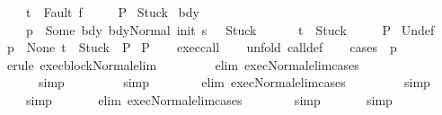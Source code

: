 \begin{isabellebody}
\ \ \ \ \ t\ {\isacharequal}\ Fault\ f{\isasymrbrakk}\isanewline
\ \ \ \ {\isasymLongrightarrow}\ P{\isachardoublequoteclose}\isanewline
{}\ Stuck{\isacharcolon}\isanewline
\ {\isachardoublequoteopen}{\isasymAnd}bdy{\isachardot}\isanewline
\ \ \ \ {\isasymlbrakk}{\isasymGamma}\ p\ {\isacharequal}\ Some\ bdy{\isacharsemicolon}\ {\isasymGamma}{\isasymturnstile}{\isasymlangle}bdy{\isacharcomma}Normal\ {\isacharparenleft}init\ s{\isacharparenright}{\isasymrangle}\ {\isasymRightarrow}\ \ Stuck{\isacharsemicolon}\ \isanewline
\ \ \ \ \ t\ {\isacharequal}\ Stuck{\isasymrbrakk}\isanewline
\ \ \ \ {\isasymLongrightarrow}\ P{\isachardoublequoteclose}\isanewline
{}\ Undef{\isacharcolon}\isanewline
\ {\isachardoublequoteopen}{\isasymlbrakk}{\isasymGamma}\ p\ {\isacharequal}\ None{\isacharsemicolon}\ t\ {\isacharequal}\ Stuck{\isasymrbrakk}\ {\isasymLongrightarrow}\ P{\isachardoublequoteclose}\isanewline
{}\ {\isachardoublequoteopen}P{\isachardoublequoteclose}\isanewline
%
\isadelimproof
\ \ %
\endisadelimproof
%
\isatagproof
{}\isamarkupfalse%
\ exec{\isacharunderscore}call\isanewline
\ \ \isamarkupfalse%
\ {\isacharparenleft}unfold\ call{\isacharunderscore}def{\isacharparenright}\isanewline
\ \ \isamarkupfalse%
\ {\isacharparenleft}cases\ {\isachardoublequoteopen}{\isasymGamma}\ p{\isachardoublequoteclose}{\isacharparenright}\isanewline
\ \ \isamarkupfalse%
\ \ {\isacharparenleft}erule\ exec{\isacharunderscore}block{\isacharunderscore}Normal{\isacharunderscore}elim{\isacharparenright}\isanewline
\ \ \isamarkupfalse%
\ \ \ \ \ \ {\isacharparenleft}elim\ exec{\isacharunderscore}Normal{\isacharunderscore}elim{\isacharunderscore}cases{\isacharparenright}\isanewline
\ \ \isamarkupfalse%
\ \ \ \ \ \ \ simp\isanewline
\ \ \isamarkupfalse%
\ \ \ \ \ \ simp\isanewline
\ \ \isamarkupfalse%
\ \ \ \ \ {\isacharparenleft}elim\ exec{\isacharunderscore}Normal{\isacharunderscore}elim{\isacharunderscore}cases{\isacharparenright}\isanewline
\ \ \isamarkupfalse%
\ \ \ \ \ \ simp\isanewline
\ \ \isamarkupfalse%
\ \ \ \ \ simp\isanewline
\ \ \isamarkupfalse%
\ \ \ \ {\isacharparenleft}elim\ exec{\isacharunderscore}Normal{\isacharunderscore}elim{\isacharunderscore}cases{\isacharparenright}\isanewline
\ \ \isamarkupfalse%
\ \ \ \ \ simp\isanewline
\ \ \isamarkupfalse%
\ \ \ \ simp\isanewline
\ \ \isamarkupfalse%

\end{isabellebody}
